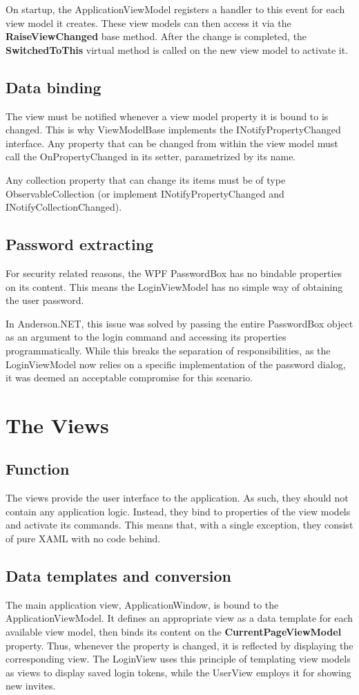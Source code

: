 \documentclass[titlepage]{scrartcl}
\begin{document}
On startup, the ApplicationViewModel registers a handler to this event for each view model it creates. These view models can then access it via the \textbf{RaiseViewChanged} base method. After the change is completed, the \textbf{SwitchedToThis} virtual method is called on the new view model to activate it. 

\subsection{Data binding}
The view must be notified whenever a view model property it is bound to is changed. This is why ViewModelBase implements the INotifyPropertyChanged interface. Any property that can be changed from within the view model must call the OnPropertyChanged in its setter, parametrized by its name.

Any collection property that can change its items must be of type ObservableCollection (or implement INotifyPropertyChanged and INotifyCollectionChanged).

\subsection{Password extracting} \label{password}
For security related reasons, the WPF PasswordBox has no bindable properties on its content. This means the LoginViewModel has no simple way of obtaining the user password.

In Anderson.NET, this issue was solved by passing the entire PasswordBox object as an argument to the login command and accessing its properties programmatically. While this breaks the separation of responsibilities, as the LoginViewModel now relies on a specific implementation of the password dialog, it was deemed an acceptable compromise for this scenario.

\section{The Views}
\subsection{Function}
The views provide the user interface to the application. As such, they should not contain any application logic. Instead, they bind to properties of the view models and activate its commands. This means that, with a single exception, they consist of pure XAML with no code behind.

\subsection{Data templates and conversion}
The main application view, ApplicationWindow, is bound to the ApplicationViewModel. It defines an appropriate view as a data template for each available view model, then binds its content on the \textbf{CurrentPageViewModel} property. Thus, whenever the property is changed, it is reflected by displaying the corresponding view. The LoginView uses this principle of templating view models as views to display saved login tokens, while the UserView employs it for showing new invites.
\end{document}
